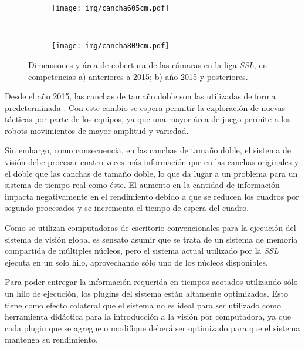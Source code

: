 \begin{figure}[h]

	\centering

	\begin{subfigure}[c]{0.45\textwidth}
		\centering
		\texttt{[image: img/cancha605cm.pdf]}
		\caption{}
	\end{subfigure}
	~
	\begin{subfigure}[c]{0.45\textwidth}
		\centering
		\texttt{[image: img/cancha809cm.pdf]}
		\caption{}
	\end{subfigure}

	\caption{Dimensiones y área de cobertura de las cámaras en la liga
	\emph{SSL}, en competencias a) anteriores a 2015; b) año 2015 y
	posteriores.}

	\label{cancha}

\end{figure}

Desde el año 2015, las canchas de tamaño doble son las utilizadas de forma
predeterminada \cite{sslrules2015}. Con este cambio se espera permitir la
exploración de nuevas tácticas por parte de los equipos, ya que una mayor área
de juego permite a los robots movimientos de mayor amplitud y variedad.

Sin embargo, como consecuencia, en las canchas de tamaño doble, el sistema de
visión debe procesar cuatro veces más información que en las canchas
originales y el doble que las canchas de tamaño doble, lo que da lugar a un
problema para un sistema de tiempo real como éste. El aumento en la cantidad
de información impacta negativamente en el rendimiento debido a que se reducen
los cuadros por segundo procesados y se incrementa el tiempo de espera del
cuadro.

Como se utilizan computadoras de escritorio convencionales para la ejecución
del sistema de visión global es sensato asumir que se trata de un sistema de
memoria compartida de múltiples núcleos, pero el sistema actual utilizado por la
\emph{SSL} ejecuta en un solo hilo, aprovechando sólo uno de los núcleos
disponibles.

Para poder entregar la información requerida en tiempos acotados utilizando sólo
un hilo de ejecución, los plugins del sistema están altamente optimizados. Esto
tiene como efecto colateral que el sistema no es ideal para ser utilizado como
herramienta didáctica para la introducción a la visión por computadora, ya que
cada plugin que se agregue o modifique deberá ser optimizado para que el sistema
mantenga su rendimiento.
